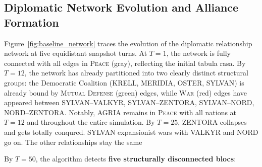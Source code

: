 \subsection{Diplomatic Network Evolution and Alliance Formation}
Figure~\ref{fig:baseline_network} traces the evolution of the diplomatic relationship network at five equidistant snapshot turns. At $T=1$, the network is fully connected with all edges in \textsc{Peace} (gray), reflecting the initial tabula rasa. By $T=12$, the network has already partitioned into two clearly distinct structural groups: the Democratic Coalition (KRELL, MERIDIA, OSTER, SYLVAN) is already bound by \textsc{Mutual Defense} (green) edges, while \textsc{War} (red) edges have appeared between SYLVAN--VALKYR, SYLVAN--ZENTORA, SYLVAN--NORD, NORD--ZENTORA. Notably, AGRIA remains in \textsc{Peace} with all nations at $T=12$ and throughout the entire simulation. By $T=25$, ZENTORA collapses and gets totally conqured. SYLVAN  expansionist wars with VALKYR and NORD go on. The other relationships stay the same

By $T=50$, the algorithm detects \textbf{five structurally disconnected blocs}:

